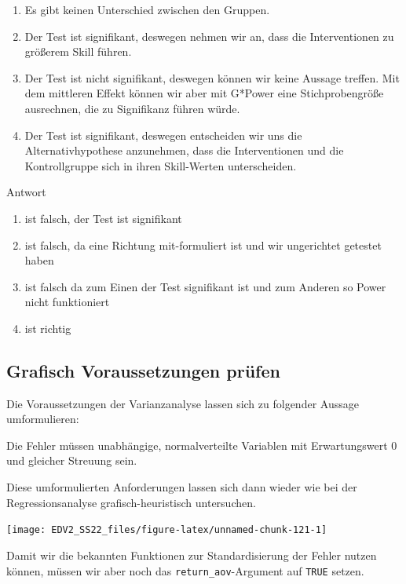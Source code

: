 \documentclass[
]{book}
\begin{document}
\begin{enumerate}
\def\labelenumi{\arabic{enumi}.}
\item
  Es gibt keinen Unterschied zwischen den Gruppen.
\item
  Der Test ist signifikant, deswegen nehmen wir an, dass die Interventionen zu größerem Skill führen.
\item
  Der Test ist nicht signifikant, deswegen können wir keine Aussage treffen. Mit dem mittleren Effekt können wir aber mit G*Power eine Stichprobengröße ausrechnen, die zu Signifikanz führen würde.
\item
  Der Test ist signifikant, deswegen entscheiden wir uns die Alternativhypothese anzunehmen, dass die Interventionen und die Kontrollgruppe sich in ihren Skill-Werten unterscheiden.
\end{enumerate}

Antwort

\begin{enumerate}
\def\labelenumi{\arabic{enumi}.}
\item
  ist falsch, der Test ist signifikant
\item
  ist falsch, da eine Richtung mit-formuliert ist und wir ungerichtet getestet haben
\item
  ist falsch da zum Einen der Test signifikant ist und zum Anderen so Power nicht funktioniert
\item
  ist richtig
\end{enumerate}

\hypertarget{grafisch-voraussetzungen-pruxfcfen}{%
\subsection{Grafisch Voraussetzungen prüfen}\label{grafisch-voraussetzungen-pruxfcfen}}

Die Voraussetzungen der Varianzanalyse lassen sich zu folgender Aussage umformulieren:

Die Fehler müssen unabhängige, normalverteilte Variablen mit Erwartungswert 0 und gleicher Streuung sein.

Diese umformulierten Anforderungen lassen sich dann wieder wie bei der Regressionsanalyse grafisch-heuristisch untersuchen.

\begin{center}\texttt{[image: EDV2\_SS22\_files/figure-latex/unnamed-chunk-121-1]} \end{center}

Damit wir die bekannten Funktionen zur Standardisierung der Fehler nutzen können, müssen wir aber noch das \texttt{return\_aov}-Argument auf \texttt{TRUE} setzen.
\end{document}
